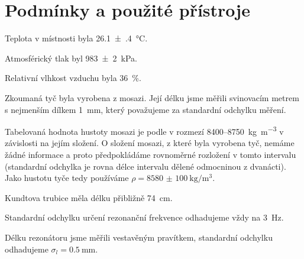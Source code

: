 \section*{Podmínky a použité přístroje}
Teplota v místnosti byla \SI{26.1(4)}{\degreeCelsius}.

Atmosférický tlak byl \SI{983(2)}{\kPa}.

Relativní vlhkost vzduchu byla \SI{36}{\percent}.

Zkoumaná tyč byla vyrobena z mosazi. 
Její délku jsme měřili svinovacím metrem s nejmenším dílkem \SI{1}{\mm}, který považujeme za standardní odchylku měření.

Tabelovaná hodnota hustoty mosazi je podle \cite{converter} v rozmezí \num{8400}--\SI{8750}{\kg\per\m\cubed} v závislosti na jejím složení.
O složení mosazi, z které byla vyrobena  tyč, nemáme žádné informace a proto předpokládáme rovnoměrné rozložení v tomto intervalu (standardní odchylka je rovna délce intervalu dělené odmocninou z dvanácti).
Jako hustotu tyče tedy používáme $\rho =  \SI{8580(100)}{\kg\per\m\cubed}$.

Kundtova trubice měla délku přibližně \SI{74}{\cm}.

Standardní odchylku určení rezonanční frekvence odhadujeme vždy na \SI{3}{\Hz}.

Délku rezonátoru jsme měřili vestavěným pravítkem, standardní odchylku odhadujeme $\sigma_l = \SI{0.5}{\mm}$.